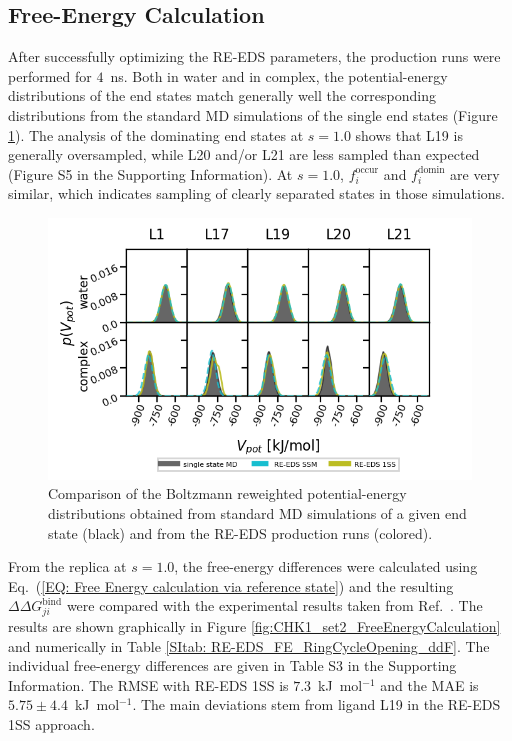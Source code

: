 \subsection{Free-Energy Calculation}
After successfully optimizing the RE-EDS parameters, the production runs were performed for $4$~ns. 
Both in water and in complex, the potential-energy distributions of the end states match generally well the corresponding distributions from the standard MD simulations of the single end states (Figure \ref{fig:RingOpening_sampling_comparison}). 
%
The analysis of the dominating end states at $s=1.0$ shows that L19 is generally oversampled, while L20 and/or L21 are less sampled than expected (Figure S5 in the Supporting Information). %
At $s=1.0$, $f_i^{\text{occur}}$ and $f_i^{\text{domin}}$ are very similar, which indicates sampling of clearly separated states in those simulations.

\begin{figure}[h]
	\centering
	\includegraphics[width=\columnwidth]{fig/results/ringOpening/FE/RingClosure_system_final_sampling.png}
	\caption{Comparison of the Boltzmann reweighted potential-energy distributions obtained from standard MD simulations of a given end state (black) and from the RE-EDS production runs (colored).}
	\label{fig:RingOpening_sampling_comparison}
\end{figure}

From the replica at $s=1.0$, the free-energy differences were calculated using Eq.~(\ref{EQ: Free Energy calculation via reference state}) and the resulting $\Delta \Delta G^\text{bind}_{ji}$ were compared with the experimental results taken from Ref.~\cite{Huang2012}. The results are shown graphically in Figure \ref{fig:CHK1_set2_FreeEnergyCalculation} and numerically in Table \ref{SItab: RE-EDS_FE_RingCycleOpening_ddF}. The individual free-energy differences are given in Table S3 in the Supporting Information. %
The RMSE with RE-EDS 1SS is $7.3$~kJ~mol$^{-1}$ and the MAE is $5.75\pm4.4$~kJ~mol$^{-1}$. 
%
%
The main deviations stem from ligand L19 in the RE-EDS 1SS approach.

